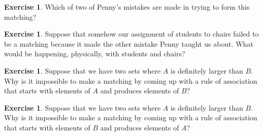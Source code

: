 \documentclass[12pt,letterpaper]{article}
\theoremstyle{definition}
\newtheorem{exercise}[question]{Exercise}
\begin{document}
\begin{exercise}
Which of two of Penny's mistakes are made in trying to form this matching?
\end{exercise}

\begin{exercise}
Suppose that somehow our assignment of students to chairs failed to be a matching because it made the other mistake Penny taught us about.
What would be happening, physically, with students and chairs?
\end{exercise}

\begin{exercise}
Suppose that we have two sets where $A$ is definitely larger than $B$.
Why is it impossible to make a matching by coming up with a rule of association that starts with elements of $A$ and produces elements of $B$?
\end{exercise}

\begin{exercise}
Suppose that we have two sets where $A$ is definitely larger than $B$.
Why is it impossible to make a matching by coming up with a rule of association that starts with elements of $B$ and produces elements of $A$?
\end{exercise}



\end{document}
